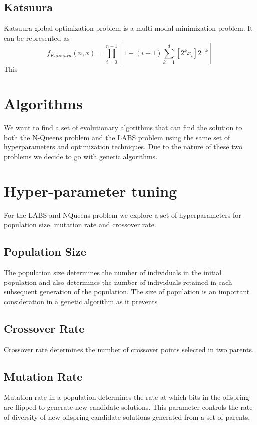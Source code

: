 \documentclass{article}
\begin{document}
\subsection{Katsuura}
Katsuura global optimization problem is a multi-modal minimization problem. It can be represented as 
\begin{equation*}
     f_{Katsuura}(n, x) = \prod_{i=0}^{n-1} [1 + (i + 1) \sum_{k=1}^{d} [2^kx_i] 2^{-k}]
\end{equation*}
This 
\section{Algorithms}
\label{sec:imple}
We want to find a set of evolutionary algorithms that can find the solution to both the N-Queens problem and the LABS problem using the same set of hyperparameters and optimization techniques. Due to the nature of these two problems we decide to go with genetic algorithms.  




\section{Hyper-parameter tuning}
For the LABS and NQueens problem we explore a set of hyperparameters for population size, mutation rate and crossover rate.

\subsection{Population Size}
The population size determines the number of individuals in the initial population and also determines the number of individuals retained in each subsequent generation of the population. The size of population is an important consideration in a genetic algorithm as it prevents 

\subsection{Crossover Rate}
Crossover rate determines the number of crossover points selected in two parents.  

\subsection{Mutation Rate}
Mutation rate in a population determines the rate at which bits in the offspring are flipped to generate new candidate solutions. This parameter controls the rate of diversity of new offspring candidate solutions generated from a set of parents.  
\end{document}
